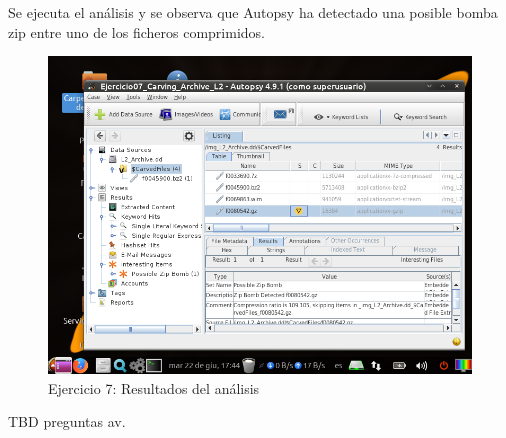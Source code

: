 \documentclass[11pt]{article}
\begin{document}
Se ejecuta el análisis y se observa que Autopsy ha detectado una posible bomba zip entre uno de los ficheros comprimidos.

\begin{figure}[H]
    \caption{Ejercicio 7: Resultados del análisis}
    \centering
    \includegraphics[scale=0.7]{e7-5.png}
\end{figure}

TBD preguntas av.



\begin{thebibliography}{8}
\end{thebibliography}
\end{document}
